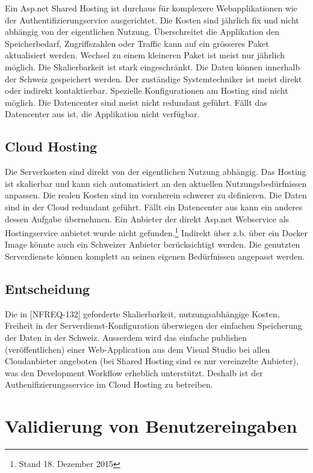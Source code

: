 Ein Asp.net Shared Hosting ist durchaus für komplexere Webapplikationen
wie der Authentifizierungservice ausgerichtet. Die Kosten sind jährlich
fix und nicht abhängig von der eigentlichen Nutzung. Überschreitet die
Applikation den Speicherbedarf, Zugriffszahlen oder Traffic kann auf ein
grösseres Paket aktualisiert werden. Wechsel zu einem kleineren Paket
ist meist nur jährlich möglich. Die Skalierbarkeit ist stark
eingeschränkt. Die Daten können innerhalb der Schweiz gespeichert
werden. Der zuständige Systemtechniker ist meist direkt oder indirekt
kontaktierbar. Spezielle Konfigurationen am Hosting sind nicht möglich.
Die Datencenter sind meist nicht redundant geführt. Fällt das
Datencenter aus ist, die Applikation nicht verfügbar.

\subsection{Cloud Hosting}\label{cloud-hosting}

Die Serverkosten sind direkt von der eigentlichen Nutzung abhängig. Das
Hosting ist skalierbar und kann sich automatisiert an den aktuellen
Nutzungsbedürfnissen anpassen. Die realen Kosten sind im vornherein
schwerer zu definieren. Die Daten sind in der Cloud redundant geführt.
Fällt ein Datencenter aus kann ein anderes dessen Aufgabe übernehmen.
Ein Anbieter der direkt Asp.net Webservice als Hostingservice anbietet
wurde nicht gefunden.\footnote{Stand 18. Dezember 2015} Indirekt über
z.b. über ein Docker Image könnte auch ein Schweizer Anbieter
berücksichtigt werden. Die genutzten Serverdienste können komplett an
seinen eigenen Bedürfnissen angepasst werden.

\subsection{Entscheidung}\label{entscheidung-3}

Die in {[}NFREQ-132{]} geforderte Skalierbarkeit, nutzungsabhängige
Kosten, Freiheit in der Serverdienst-Konfiguration überwiegen der
einfachen Speicherung der Daten in der Schweiz. Ausserdem wird das
einfache publishen (veröffentlichen) einer Web-Application aus dem
Visual Studio bei allen Cloudanbieter angeboten (bei Shared Hosting sind
es nur vereinzelte Anbieter), was den Development Workflow erheblich
unterstützt. Deshalb ist der Authenifizierungsservice im Cloud Hosting
zu betreiben.

\section{Validierung von
Benutzereingaben}\label{validierung-von-benutzereingaben}


